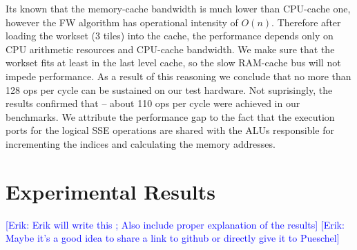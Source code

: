 \documentclass[letterpaper]{article}
\newcommand{\erik}[1]{\textcolor{blue}{[Erik: #1]}}
\begin{document}
Its known that the memory-cache bandwidth is much lower than CPU-cache one, however the FW algorithm has operational intensity of \(O(n)\). 
Therefore after loading the workset (3 tiles) into the cache, the performance depends only on CPU arithmetic resources and CPU-cache bandwidth. 
We make sure that the workset fits at least in the last level cache, so the slow RAM-cache bus will not impede performance. As a result of this reasoning we conclude that no more than 
128 ops per cycle can be sustained on our test hardware. Not suprisingly, the results confirmed that -- about 110 ops per cycle were achieved in our benchmarks. We attribute the performance gap to the fact that 
the execution ports for the logical SSE operations are shared with the ALUs responsible for incrementing the indices and calculating the memory addresses.

\section{Experimental Results}\label{sec:exp}
\erik{Erik will write this ; Also include proper explanation of the results}
\erik{Maybe it's a good idea to share a link to github or directly give it to Pueschel}
\end{document}
